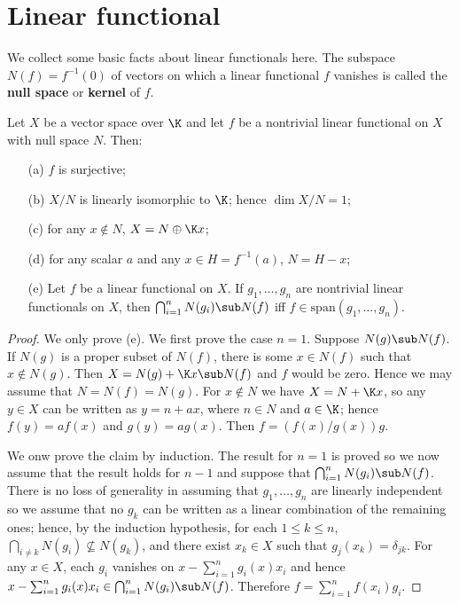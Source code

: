 \section{Linear functional}
We collect some basic facts about linear functionals here. The subspace $N(f)=f^{-1}(0)$ of vectors on which a linear functional $f$ vanishes is called the \textbf{null space} or \textbf{kernel} of $f$.
\begin{proposition}\label{linear functional prop}
Let $X$ be a vector space over $\K$ and let $f$ be a nontrivial linear functional on $X$ with null space $N$. Then:
\begin{itemize}
\item[(a)] $f$ is surjective;
\item[(b)] $X/N$ is linearly isomorphic to $\K$; hence $\dim X/N=1$;
\item[(c)] for any $x\notin N$, $X=N\oplus\K x$;
\item[(d)] for any scalar $a$ and any $x\in H=f^{-1}(a)$, $N=H-x$; 
\item[(e)] Let $f$ be a linear functional on $X$. If $g_1,\dots,g_n$ are nontrivial linear functionals on $X$, then $\bigcap_{i=1}^{n}N(g_i)\sub N(f)$ iff $f\in\mathrm{span}(g_1,\dots,g_n)$.
\end{itemize}
\end{proposition}
\begin{proof}
We only prove (e). We first prove the case $n=1$. Suppose $N(g)\sub N(f)$. If $N(g)$ is a proper subset of $N(f)$, there is some $x\in N(f)$ such that $x\notin N(g)$. Then $X=N(g)+\K x\sub N(f)$ and $f$ would be zero. Hence we may assume that $N=N(f)=N(g)$. For $x\notin N$ we have $X=N+\K x$, so any $y\in X$ can be written as $y=n+ax$, where $n\in N$ and $a\in\K$; hence $f(y)=af(x)$ and $g(y)=ag(x)$. Then $f=(f(x)/g(x))g$.\par
We onw prove the claim by induction. The result for $n=1$ is proved so we now assume that the result holds for $n-1$ and suppose that $\bigcap_{i=1}^{n}N(g_i)\sub N(f)$. There is no loss of generality in assuming that $g_1,\dots,g_n$ are linearly independent so we assume that no $g_k$ can be written as a linear combination of the remaining ones; hence, by the induction hypothesis, for each $1\leq k\leq n$, $\bigcap_{i\neq k}N(g_i)\nsubseteq N(g_k)$, and there exist $x_k\in X$ such that $g_j(x_k)=\delta_{jk}$. For any $x\in X$, each $g_i$ vanishes on $x-\sum_{i=1}^{n}g_i(x)x_i$ and hence $x-\sum_{i=1}^{n}g_i(x)x_i\in\bigcap_{i=1}^{n}N(g_i)\sub N(f)$. Therefore $f=\sum_{i=1}^{n}f(x_i)g_i$.
\end{proof}
